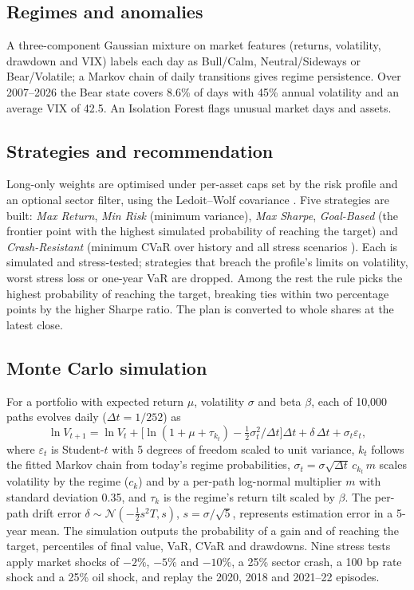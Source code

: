\documentclass[conference]{IEEEtran}
\begin{document}
\subsection{Regimes and anomalies}
A three-component Gaussian mixture on market features (returns, volatility, drawdown and VIX) labels each day as Bull/Calm, Neutral/Sideways or Bear/Volatile; a Markov chain of daily transitions gives regime persistence. Over 2007--2026 the Bear state covers 8.6\% of days with 45\% annual volatility and an average VIX of 42.5. An Isolation Forest \cite{liu2008} flags unusual market days and assets.

\subsection{Strategies and recommendation}
Long-only weights are optimised under per-asset caps set by the risk profile and an optional sector filter, using the Ledoit--Wolf covariance \cite{ledoit2004}. Five strategies are built: \emph{Max Return}, \emph{Min Risk} (minimum variance), \emph{Max Sharpe}, \emph{Goal-Based} (the frontier point with the highest simulated probability of reaching the target) and \emph{Crash-Resistant} (minimum CVaR over history and all stress scenarios \cite{rockafellar2000}). Each is simulated and stress-tested; strategies that breach the profile's limits on volatility, worst stress loss or one-year VaR are dropped. Among the rest the rule picks the highest probability of reaching the target, breaking ties within two percentage points by the higher Sharpe ratio. The plan is converted to whole shares at the latest close.

\subsection{Monte Carlo simulation}
For a portfolio with expected return $\mu$, volatility $\sigma$ and beta $\beta$, each of 10,000 paths evolves daily ($\Delta t = 1/252$) as
\begin{equation}
\ln V_{t+1} = \ln V_t + \big[\ln(1 + \mu + \tau_{k_t}) - \tfrac{1}{2}\sigma_t^2/\Delta t\big]\Delta t + \delta\,\Delta t + \sigma_t \varepsilon_t ,
\end{equation}
where $\varepsilon_t$ is Student-$t$ with 5 degrees of freedom scaled to unit variance, $k_t$ follows the fitted Markov chain from today's regime probabilities, $\sigma_t = \sigma\sqrt{\Delta t}\,c_{k_t}\,m$ scales volatility by the regime ($c_k$) and by a per-path log-normal multiplier $m$ with standard deviation 0.35, and $\tau_k$ is the regime's return tilt scaled by $\beta$. The per-path drift error $\delta \sim \mathcal N(-\tfrac12 s^2 T, s)$, $s = \sigma/\sqrt{5}$, represents estimation error in a 5-year mean. The simulation outputs the probability of a gain and of reaching the target, percentiles of final value, VaR, CVaR and drawdowns. Nine stress tests apply market shocks of $-2\%$, $-5\%$ and $-10\%$, a 25\% sector crash, a 100 bp rate shock and a 25\% oil shock, and replay the 2020, 2018 and 2021--22 episodes.
\end{document}

